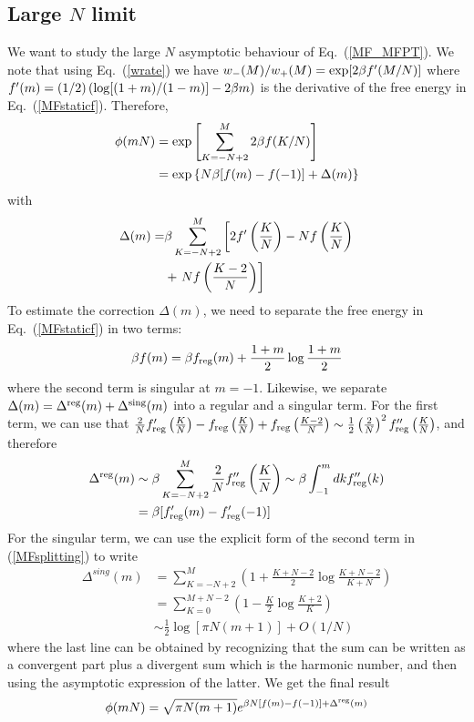 \documentclass[aps,twocolumn,floats,pre,amsmath,superscriptaddress]{revtex4}
\newcommand{\beq}{\begin{equation}}
\newcommand{\eeq}{\end{equation}}
\let\D=\Delta \let\L=\Lambda \let\X=\Xi \let\P=\Pi
\newcommand{\<}{\langle}
\renewcommand{\>}{\rangle}
\renewcommand{\P}{ \mathbb{P}}
\begin{document}
\subsection{Large $N$ limit}
We want to study the large $N$ asymptotic behaviour of Eq.~(\ref{MF_MFPT}).
We note that using Eq.~(\ref{wrate}) we have
$w_-(M)/w_+(M) = \exp[2\beta f'(M/N)]$
where $f'(m) = (1/2) \left( \log [(1+m)/(1-m)]-2 \beta m \right)$ is the derivative of the free energy
in Eq.~(\ref{MFstaticf}). Therefore,
\beq\begin{split}
\phi(m N) &= \exp\left[\sum_{K=-N+2}^M 2 \b f(K/N)\right] \\
&=
\exp\left\{N \b [ f(m) - f(-1) ] + \D(m) \right\}
\end{split}
\eeq
with
\beq\begin{split}
\D(m) = &\b \sum_{K=-N+2}^M \left[ 2 f'\left(\frac{K}{N}\right) - N
  f\left(\frac{K}{N}\right) \right.\\
&+ \left. N f\left(\frac{K-2}{N}\right) \right]
\end{split}\eeq
To estimate the correction $\D(m)$, we need to separate the free energy in Eq.~(\ref{MFstaticf}) in two terms:
\beq\label{MFsplitting}
\b f(m) = \b f_{\rm reg}(m) +\frac{1+m}2 \log \frac{1+m}2
\eeq
where the second term is singular at $m=-1$. Likewise, we separate
$\D(m)=\D^{\rm reg}(m)+\D^{\rm sing}(m)$ into a regular and a singular
term.
For the first term, we can use that
$\frac{2}{N} f'_{\rm reg}\left(\frac{K}{N}\right) - f_{\rm reg}\left(\frac{K}{N}\right) + f_{\rm reg}\left(\frac{K-2}{N}\right) \sim 
\frac12 \left(\frac{2}{N}\right)^2 f''_{\rm reg}\left(\frac{K}{N}\right)$, and therefore
\beq\begin{split}
\D^{\rm reg}(m) &\sim \b \sum_{K=-N+2}^M \frac{2}{N} f''_{\rm reg}\left(\frac{K}{N}\right)
 \sim \b \int_{-1}^m dk f''_{\rm reg}(k) \\
& = \b [ f'_{\rm reg}(m) - f'_{\rm reg}(-1) ] 
\end{split}\eeq
For the singular term, we can use the explicit form of the second term in (\ref{MFsplitting})
to write
\beq\begin{split}
\D^{sing}(m) &= \sum_{K=-N+2}^M \left( 1 + \frac{K+N-2}2 \log \frac{K+N-2}{K+N} \right) \\
& = \sum_{K=0}^{M+N-2} \left( 1 - \frac{K}2 \log \frac{K+2}{K} \right) \\
&\sim \frac12 \log[\pi N (m+1)] + O(1/N)
\end{split}\eeq
where the last line can be obtained by recognizing that the sum can be written as a convergent
part plus a divergent sum which is the harmonic number, and then using the asymptotic expression
of the latter. We get the final result
\beq
\phi(mN) = \sqrt{\pi N (m+1)} e^{\b N [f(m)-f(-1)] + \D^{\rm reg}(m) }
\eeq
\end{document}
